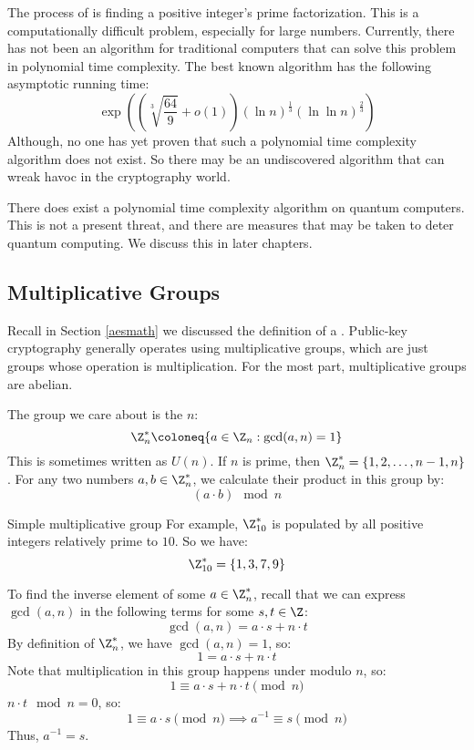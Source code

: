 The process of  is finding a positive integer's prime factorization. This is a computationally difficult problem, especially for large numbers. Currently, there has not been an algorithm for traditional computers that can solve this problem in polynomial time complexity. The best known algorithm has the following asymptotic running time:
\[ \exp\left( \left( \sqrt[3]{\frac{64}{9}} + o(1) \right) (\ln n)^{\frac13} (\ln \ln n)^{\frac23} \right) \] 
Although, no one has yet proven that such a polynomial time complexity algorithm does not exist. So there may be an undiscovered algorithm that can wreak havoc in the cryptography world.

\begin{notebox}
    There does exist a polynomial time complexity algorithm on quantum computers. This is not a present threat, and there are measures that may be taken to deter quantum computing. We discuss this in later chapters.
\end{notebox}

\subsection{Multiplicative Groups}
Recall in Section \ref{aesmath} we discussed the definition of a . Public-key cryptography generally operates using multiplicative groups, which are just groups whose operation is multiplication. For the most part, multiplicative groups are abelian.

The group we care about is the  $n$:
\[\Z_n^* \coloneq \{ a \in \Z_n : \gcd(a,n) = 1 \}\]
This is sometimes written as $U(n)$. If $n$ is prime, then $\Z_n^* = \{ 1, 2, \ldots, n - 1, n \}$. For any two numbers $a,b \in \Z_n^*$, we calculate their product in this group by:
\[ (a \cdot b) \mod n \]

\begin{exbox}{Simple multiplicative group}{}
    For example, $\Z_{10}^*$ is populated by all positive integers relatively prime to $10$. So we have:
    \[ \Z_{10}^* = \{ 1, 3, 7, 9 \} \]
\end{exbox}

To find the inverse element of some $a \in \Z_n^*$, recall that we can express $\gcd(a,n)$ in the following terms for some $s,t \in \Z$:
\[ \gcd(a,n) = a \cdot s + n \cdot t \]
By definition of $\Z_n^*$, we have $\gcd(a,n) = 1$, so:
\[ 1 = a \cdot s + n \cdot t \]
Note that multiplication in this group happens under modulo $n$, so:
\[ 1 \equiv a \cdot s + n \cdot t \pmod{n} \]
$n \cdot t \mod n = 0$, so:
\[ 1 \equiv a \cdot s \pmod{n} \implies a^{-1} \equiv s \pmod{n} \]
Thus, $a^{-1} = s$.

